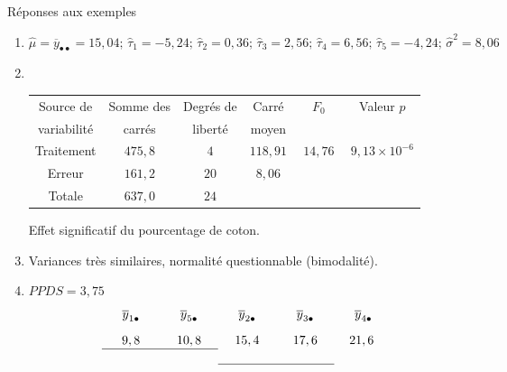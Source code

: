 \documentclass{BeamerTemplate}
\begin{document}
\begin{frame}[t]{Réponses aux exemples}

{\scriptsize

\begin{enumerate}
  \item  $\hat\mu=\overline y_{\bullet\bullet}=15,04;\, \hat\tau_1=-5,24;\, \hat\tau_2=0,36;\, \hat\tau_3=2,56;\, \hat\tau_4=6,56;\, \hat\tau_5=-4,24;\,\hat\sigma^2=8,06$
 \item $\mbox{ }$

 \begin{tabular}{cccccc}\hline
Source de & Somme des & Degrés de & Carré & $\quad F_0\quad $ & Valeur $p$ \\
variabilité & carrés & liberté & moyen & & \\ \hline
Traitement & $475,8$ & $4$ & $118,91$ & $14,76$ & $9,13\times 10^{-6}$\\
Erreur & $161,2$ & $20$ &$ 8,06$ & & \\\hline
Totale &$637,0$ &$24$ & & & \\\hline
\end{tabular}

      Effet significatif du pourcentage de coton.
 \item Variances très similaires, normalité questionnable (bimodalité).
 \item $PPDS=3,75$
  $$
\begin{array}{c c c c c}
\;\;\;\;\overline y_{1\bullet} \;\;\;\;&\;\;\;\; \overline
y_{5\bullet} \;\;\;\;& \;\;\;\;\overline y_{2\bullet} \;\;\;\;
&\;\;\;\;\overline y_{3\bullet} \;\;\;\;&\;\;\;\;
\overline y_{4\bullet} \;\;\;\;\\[.3cm]
9,8 & 10,8 & 15,4 & 17,6 & 21,6
\\ \cline{1-2}\\\cline{3-4}
\end{array}
$$
 \end{enumerate}

 }
\end{frame}
\end{document}
